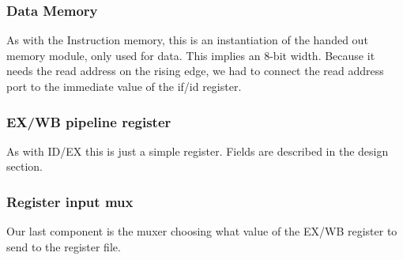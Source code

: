 \documentclass[11pt]{report}
\begin{document}
\subsubsection*{Data Memory}
As with the Instruction memory, this is an instantiation of the handed out memory
module, only used for data. This implies an 8-bit width. Because it needs the read address
on the rising edge, we had to connect the read address port to the immediate value of the
if/id register.
\subsubsection*{EX/WB pipeline register}
As with ID/EX this is just a simple register. Fields are described in the design section.
\subsubsection*{Register input mux}
Our last component is the muxer choosing what value of the EX/WB register to send to the
register file. 
\end{document}

